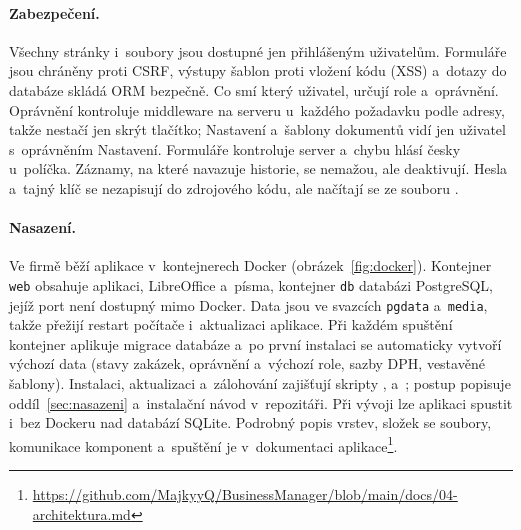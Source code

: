 \paragraph{Zabezpečení.} Všechny stránky i~soubory jsou dostupné jen přihlášeným uživatelům. Formuláře jsou chráněny proti CSRF, výstupy šablon proti vložení kódu (XSS) a~dotazy do databáze skládá ORM bezpečně. Co smí který uživatel, určují role a~oprávnění. Oprávnění kontroluje middleware na serveru u~každého požadavku podle adresy, takže nestačí jen skrýt tlačítko; Nastavení a~šablony dokumentů vidí jen uživatel s~oprávněním Nastavení. Formuláře kontroluje server a~chybu hlásí česky u~políčka. Záznamy, na které navazuje historie, se nemažou, ale deaktivují. Hesla a~tajný klíč se nezapisují do zdrojového kódu, ale načítají se ze souboru .

\paragraph{Nasazení.} Ve firmě běží aplikace v~kontejnerech Docker (obrázek~\ref{fig:docker}). Kontejner \texttt{web} obsahuje aplikaci, LibreOffice a~písma, kontejner \texttt{db} databázi PostgreSQL, jejíž port není dostupný mimo Docker. Data jsou ve svazcích \texttt{pgdata} a~\texttt{media}, takže přežijí restart počítače i~aktualizaci aplikace. Při každém spuštění kontejner aplikuje migrace databáze a~po první instalaci se automaticky vytvoří výchozí data (stavy zakázek, oprávnění a~výchozí role, sazby DPH, vestavěné šablony). Instalaci, aktualizaci a~zálohování zajišťují skripty ,  a~; postup popisuje oddíl~\ref{sec:nasazeni} a~instalační návod v~repozitáři. Při vývoji lze aplikaci spustit i~bez Dockeru nad databází SQLite. Podrobný popis vrstev, složek se soubory, komunikace komponent a~spuštění je v~dokumentaci aplikace\footnote{\url{https://github.com/MajkyyQ/BusinessManager/blob/main/docs/04-architektura.md}}.


